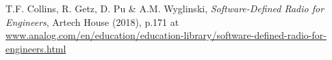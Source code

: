 \documentclass{article}
\begin{document}
\begin{thebibliography}{9}
 T.F. Collins, R. Getz, D. Pu \& A.M. Wyglinski, {\em Software-Defined 
Radio for Engineers}, Artech House (2018), p.171 at
\url{www.analog.com/en/education/education-library/software-defined-radio-for-engineers.html}
\end{thebibliography}
\end{document}
